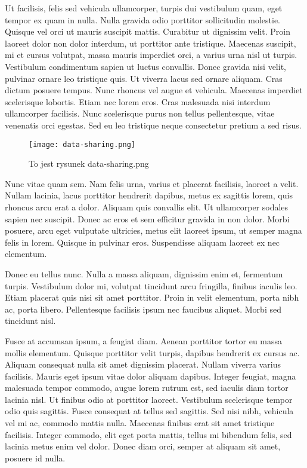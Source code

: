 \documentclass[12pt]{article}
\begin{document}
Ut facilisis, felis sed vehicula ullamcorper, turpis dui vestibulum quam, eget tempor ex quam in nulla. Nulla gravida odio porttitor sollicitudin molestie. Quisque vel orci ut mauris suscipit mattis. Curabitur ut dignissim velit. Proin laoreet dolor non dolor interdum, ut porttitor ante tristique. Maecenas suscipit, mi et cursus volutpat, massa mauris imperdiet orci, a varius urna nisl ut turpis. Vestibulum condimentum sapien ut luctus convallis. Donec gravida nisi velit, pulvinar ornare leo tristique quis. Ut viverra lacus sed ornare aliquam. Cras dictum posuere tempus. Nunc rhoncus vel augue et vehicula. Maecenas imperdiet scelerisque lobortis. Etiam nec lorem eros. Cras malesuada nisi interdum ullamcorper facilisis. Nunc scelerisque purus non tellus pellentesque, vitae venenatis orci egestas. Sed eu leo tristique neque consectetur pretium a sed risus.

\begin{figure}[b]
    \centering
    
    \texttt{[image: data-sharing.png]}
    \caption{To jest rysunek data-sharing.png}
    \label{fig:data}
\end{figure}

Nunc vitae quam sem. Nam felis urna, varius et placerat facilisis, laoreet a velit. Nullam lacinia, lacus porttitor hendrerit dapibus, metus ex sagittis lorem, quis rhoncus arcu erat a dolor. Aliquam quis convallis elit. Ut ullamcorper sodales sapien nec suscipit. Donec ac eros et sem efficitur gravida in non dolor. Morbi posuere, arcu eget vulputate ultricies, metus elit laoreet ipsum, ut semper magna felis in lorem. Quisque in pulvinar eros. Suspendisse aliquam laoreet ex nec elementum.

Donec eu tellus nunc. Nulla a massa aliquam, dignissim enim et, fermentum turpis. Vestibulum dolor mi, volutpat tincidunt arcu fringilla, finibus iaculis leo. Etiam placerat quis nisi sit amet porttitor. Proin in velit elementum, porta nibh ac, porta libero. Pellentesque facilisis ipsum nec faucibus aliquet. Morbi sed tincidunt nisl.

Fusce at accumsan ipsum, a feugiat diam. Aenean porttitor tortor eu massa mollis elementum. Quisque porttitor velit turpis, dapibus hendrerit ex cursus ac. Aliquam consequat nulla sit amet dignissim placerat. Nullam viverra varius facilisis. Mauris eget ipsum vitae dolor aliquam dapibus. Integer feugiat, magna malesuada tempor commodo, augue lorem rutrum est, sed iaculis diam tortor lacinia nisl. Ut finibus odio at porttitor laoreet. Vestibulum scelerisque tempor odio quis sagittis. Fusce consequat at tellus sed sagittis. Sed nisi nibh, vehicula vel mi ac, commodo mattis nulla. Maecenas finibus erat sit amet tristique facilisis. Integer commodo, elit eget porta mattis, tellus mi bibendum felis, sed lacinia metus enim vel dolor. Donec diam orci, semper at aliquam sit amet, posuere id nulla.
\end{document}
